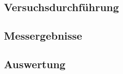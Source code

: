 \documentclass[12pt,a4paper]{article}
\begin{document}
\subsection*{Versuchsdurchführung}

\subsection*{Messergebnisse}
\subsection*{Auswertung}
\end{document}
